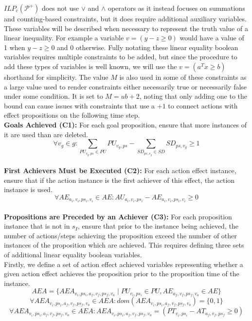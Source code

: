 $\mathit{ILP_c}(\mathcal{P}^+)$ does not use $\vee$ and $\wedge$ operators as it instead focuses on summations and counting-based constraints, but it does require additional auxiliary variables. These variables will be described when necessary to represent the truth value of a linear inequality. For example a variable $v=(y-z\geq 0)$ would have a value of 1 when $y-z\geq 0$ and 0 otherwise. Fully notating these linear equality boolean variables requires multiple constraints to be added, but since the procedure to add these types of variables is well known, we will use the $v=(a^Tx\geq b)$ shorthand for simplicity. The value $M$ is also used in some of these constraints as a large value used to render constraints either necessarily true or necessarily false under some condition. It is set to $M=ub+2$, noting that only adding one to the bound can cause issues with constraints that use a $+1$ to connect actions with effect propositions on the following time step.\\


\textbf{Goals Achieved (C1):} For each goal proposition, ensure that more instances of it are used than are deleted.
\[\forall v_g\in g:\sum_{PU_{v_g,ps}\in PU}PU_{v_g,ps}-\sum_{SD_{ps,v_g}\in SD}SD_{ps,v_g}\geq 1\]\\


\textbf{First Achievers Must be Executed (C2):} For each action effect instance, ensure that if the action instance is the first achiever of this effect, the action instance is used.
\[ \forall AE_{a_i,v_i,ps_i,v_i}\in AE: AU_{a_i,v_i,ps_i}-AE_{a_i,v_i,ps_i,v_i}\geq 0\]\\


\textbf{Propositions are Preceded by an Achiever (C3):} For each proposition instance that is not in $s_I$, ensure that prior to the instance being achieved, the number of actions/steps achieving the proposition exceed the number of other instances of the proposition which are achieved. This requires defining three sets of additional linear equality boolean variables.\\


Firstly, we define a set of action effect achieved variables representing whether a given action effect achieves the proposition prior to the proposition time of the instance.
\[AEA=\{AEA_{v_i,ps_i,a_f,v_f,ps_f,v_a}\mid PU_{v_i,ps_i}\in PU,AE_{a_f,v_f,ps_f,v_a}\in AE\}\]
\[ \forall AEA_{v_i,ps_i,a_f,v_f,ps_f,v_a}\in AEA:\mathit{dom}(AEA_{v_i,ps_i,a_f,v_f,ps_f,v_a})=\{0,1\}\]
\[ \forall AEA_{v_i,ps_i,a_f,v_f,ps_f,v_a}\in AEA:AEA_{v_i,ps_i,a_f,v_f,ps_f,v_a}=(PT_{v_i,ps_i}-AT_{a_f,v_f,ps_f}\geq 0)\]\\


